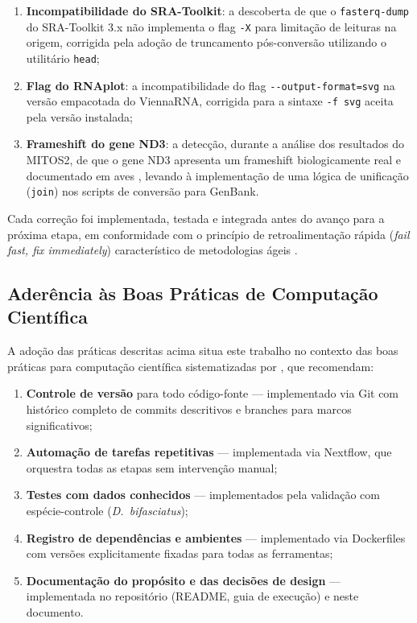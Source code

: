 \begin{enumerate}
    \item \textbf{Incompatibilidade do SRA-Toolkit}: a descoberta de que o \texttt{fasterq-dump} do SRA-Toolkit 3.x não implementa o flag \texttt{-X} para limitação de leituras na origem, corrigida pela adoção de truncamento pós-conversão utilizando o utilitário \texttt{head};
    \item \textbf{Flag do RNAplot}: a incompatibilidade do flag \texttt{-{}-output-format=svg} na versão empacotada do ViennaRNA, corrigida para a sintaxe \texttt{-f svg} aceita pela versão instalada;
    \item \textbf{Frameshift do gene ND3}: a detecção, durante a análise dos resultados do MITOS2, de que o gene ND3 apresenta um frameshift biologicamente real e documentado em aves \cite{mindell1998}, levando à implementação de uma lógica de unificação (\texttt{join}) nos scripts de conversão para GenBank.
\end{enumerate}

Cada correção foi implementada, testada e integrada antes do avanço para a próxima etapa, em conformidade com o princípio de retroalimentação rápida (\textit{fail fast, fix immediately}) característico de metodologias ágeis \cite{sommerville2016}.

\subsection{Aderência às Boas Práticas de Computação Científica}

A adoção das práticas descritas acima situa este trabalho no contexto das boas práticas para computação científica sistematizadas por , que recomendam:

\begin{enumerate}
    \item \textbf{Controle de versão} para todo código-fonte --- implementado via Git com histórico completo de commits descritivos e branches para marcos significativos;
    \item \textbf{Automação de tarefas repetitivas} --- implementada via Nextflow, que orquestra todas as etapas sem intervenção manual;
    \item \textbf{Testes com dados conhecidos} --- implementados pela validação com espécie-controle (\textit{D.~bifasciatus});
    \item \textbf{Registro de dependências e ambientes} --- implementado via Dockerfiles com versões explicitamente fixadas para todas as ferramentas;
    \item \textbf{Documentação do propósito e das decisões de design} --- implementada no repositório (README, guia de execução) e neste documento.
\end{enumerate}

